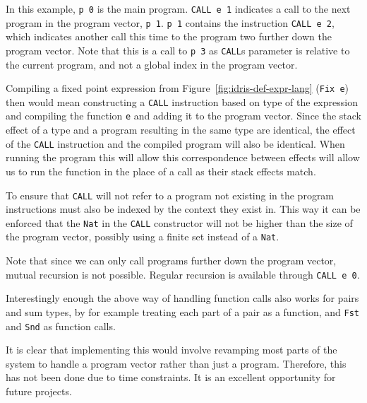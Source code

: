 In this example, \texttt{p 0} is the main program. \texttt{CALL e 1} indicates a call to the next program in the program vector, \texttt{p 1}. \texttt{p 1} contains the instruction \texttt{CALL e 2}, which indicates another call this time to the program two further down the program vector. Note that this is a call to \texttt{p 3} as \texttt{CALL}s parameter is relative to the current program, and not a global index in the program vector. 

Compiling a fixed point expression from Figure~\ref{fig:idris-def-expr-lang} (\texttt{Fix e}) then would mean constructing a \texttt{CALL} instruction based on type of the expression and compiling the function \texttt{e} and adding it to the program vector. Since the stack effect of a type and a program resulting in the same type are identical, the effect of the \texttt{CALL} instruction and the compiled program will also be identical. When running the program this will allow this correspondence between effects will allow us to run the function in the place of a call as their stack effects match.

To ensure that \texttt{CALL} will not refer to a program not existing in the program instructions must also be indexed by the context they exist in. This way it can be enforced that the \texttt{Nat} in the \texttt{CALL} constructor will not be higher than the size of the program vector, possibly using a finite set instead of a \texttt{Nat}.

Note that since we can only call programs further down the program vector, mutual recursion is not possible. Regular recursion is available through \texttt{CALL~e~0}.

Interestingly enough the above way of handling function calls also works for pairs and sum types, by for example treating each part of a pair as a function, and \texttt{Fst} and \texttt{Snd} as function calls.

It is clear that implementing this would involve revamping most parts of the system to handle a program vector rather than just a program. Therefore, this has not been done due to time constraints. It is an excellent opportunity for future projects.
